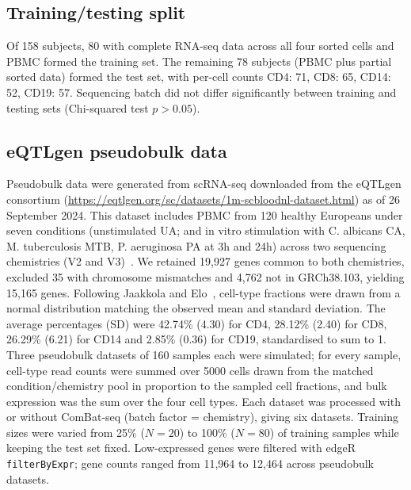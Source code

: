 \documentclass[11pt]{article}
\begin{document}
\subsection{Training/testing split}
Of 158 subjects, 80 with complete RNA-seq data across all four sorted cells and PBMC formed the training set. The remaining 78 subjects (PBMC plus partial sorted data) formed the test set, with per-cell counts CD4: 71, CD8: 65, CD14: 52, CD19: 57. Sequencing batch did not differ significantly between training and testing sets (Chi-squared test $p > 0.05$).

\subsection{eQTLgen pseudobulk data}
Pseudobulk data were generated from scRNA-seq downloaded from the eQTLgen consortium (\url{https://eqtlgen.org/sc/datasets/1m-scbloodnl-dataset.html}) as of 26 September 2024. This dataset includes PBMC from 120 healthy Europeans under seven conditions (unstimulated UA; and in vitro stimulation with C. albicans CA, M. tuberculosis MTB, P. aeruginosa PA at 3h and 24h) across two sequencing chemistries (V2 and V3)~\citep{oosterhoff2023eqtlgen}. We retained 19{,}927 genes common to both chemistries, excluded 35 with chromosome mismatches and 4{,}762 not in GRCh38.103, yielding 15{,}165 genes. Following Jaakkola and Elo~\citep{jaakkola2022pseudobulk}, cell-type fractions were drawn from a normal distribution matching the observed mean and standard deviation. The average percentages (SD) were 42.74\% (4.30) for CD4, 28.12\% (2.40) for CD8, 26.29\% (6.21) for CD14 and 2.85\% (0.36) for CD19, standardised to sum to 1. Three pseudobulk datasets of 160 samples each were simulated; for every sample, cell-type read counts were summed over 5000 cells drawn from the matched condition/chemistry pool in proportion to the sampled cell fractions, and bulk expression was the sum over the four cell types. Each dataset was processed with or without ComBat-seq (batch factor = chemistry), giving six datasets. Training sizes were varied from 25\% ($N=20$) to 100\% ($N=80$) of training samples while keeping the test set fixed. Low-expressed genes were filtered with edgeR \texttt{filterByExpr}; gene counts ranged from 11{,}964 to 12{,}464 across pseudobulk datasets.
\end{document}

